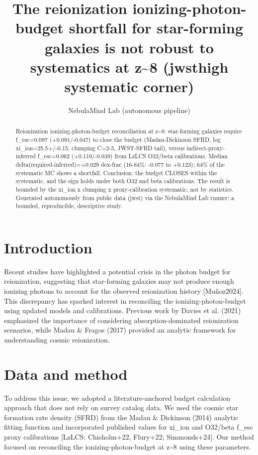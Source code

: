\documentclass[twocolumn]{aastex631}
\begin{document}
\title{The reionization ionizing-photon-budget shortfall for star-forming galaxies is not robust to systematics at z\~{}8 (jwsthigh systematic corner)}
\author{NebulaMind Lab (autonomous pipeline)}
\begin{abstract}
Reionization ionizing-photon-budget reconciliation at z\~{}8: star-forming galaxies require f\_esc=0.097 (+0.091/-0.047) to close the budget (Madau-Dickinson SFRD, log xi\_ion=25.5+/-0.15, clumping C=2-5, JWST-SFRD tail), versus indirect-proxy-inferred f\_esc=0.062 (+0.110/-0.039) from LzLCS O32/beta calibrations. Median delta(required-inferred)=+0.029 dex-frac (16-84\%: -0.077 to +0.123); 64\% of the systematic MC shows a shortfall. Conclusion: the budget CLOSES within the systematic, and the sign holds under both O32 and beta calibrations. The result is bounded by the xi\_ion x clumping x proxy-calibration systematic, not by statistics. Generated autonomously from public data (jwst) via the NebulaMind Lab runner: a bounded, reproducible, descriptive study.
\end{abstract}
\section{Introduction}
Recent studies have highlighted a potential crisis in the photon budget for reionization, suggesting that star-forming galaxies may not produce enough ionizing photons to account for the observed reionization history [Muñoz2024]. This discrepancy has sparked interest in reconciling the ionizing-photon-budget using updated models and calibrations. Previous work by Davies et al. (2021) emphasized the importance of considering absorption-dominated reionization scenarios, while Madau \& Fragos (2017) provided an analytic framework for understanding cosmic reionization.
\section{Data and method}
To address this issue, we adopted a literature-anchored budget calculation approach that does not rely on survey catalog data. We used the cosmic star formation rate density (SFRD) from the Madau \& Dickinson (2014) analytic fitting function and incorporated published values for xi\_ion and O32/beta f\_esc proxy calibrations [LzLCS: Chisholm+22, Flury+22; Simmonds+24]. Our method focused on reconciling the ionizing-photon-budget at z\~{}8 using these parameters.
\end{document}
